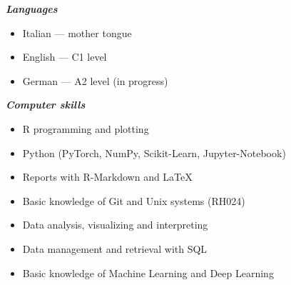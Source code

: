 \documentclass[10pt]{article}
\begin{document}
	\textbf{\textit{Languages}}
	\vspace{-1mm}
	\begin{itemize}
		\item Italian --- mother tongue
		\item English --- C1 level
		\item German --- A2 level (in progress)
	\end{itemize}
	\medskip
	\textbf{\textit{Computer skills}}
	\vspace{-1mm}
	\begin{itemize}
		\item R programming and plotting
		\item Python (PyTorch, NumPy, Scikit-Learn, Jupyter-Notebook)
		\item Reports with R-Markdown and LaTeX
		\item Basic knowledge of Git and Unix systems (RH024)
		\item Data analysis, visualizing and interpreting
		\item Data management and retrieval with SQL
		\item Basic knowledge of Machine Learning and Deep Learning
	\end{itemize}
	\medskip
	
\end{document}
